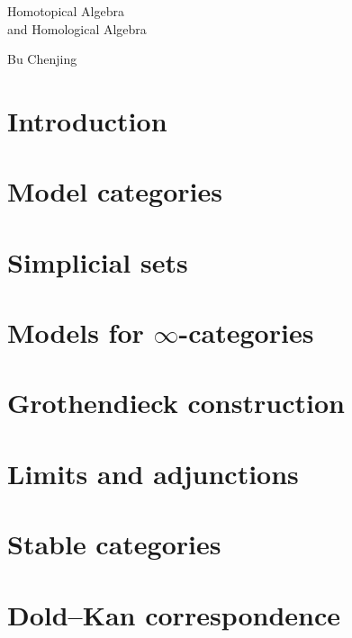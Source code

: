 \documentclass{article}
\begin{document}
\noindent
{\LARGE Homotopical Algebra\\[3pt]and Homological Algebra}
\vspace{20pt}

\noindent
Bu Chenjing
\vspace{40pt}

\section{Introduction}



\section{Model categories}



\section{Simplicial sets}



\section{Models for \texorpdfstring{$\infty$}{∞}-categories}



\section{Grothendieck construction}



\section{Limits and adjunctions}



\section{Stable categories}



\section{Dold--Kan correspondence}


\end{document}
